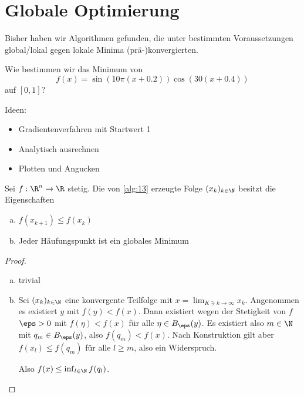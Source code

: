 \chapter{Globale Optimierung}



Bisher haben wir Algorithmen gefunden, die unter bestimmten Voraussetzungen global/lokal gegen lokale Minima (prä-)konvergierten.

Wie bestimmen wir das Minimum von
\[
	f(x) = \sin( 10 \pi (x + 0.2) ) \cos (30 (x + 0.4))
\]
auf $[0, 1]$?

Ideen:
\begin{itemize}
	\item
		Gradientenverfahren mit Startwert 1
	\item
		Analytisch ausrechnen
	\item
		Plotten und Angucken
\end{itemize}

\begin{alg} \label{alg:13}
	\begin{algorithmic}
			\Else
			\EndIf
		\EndFor
	\end{algorithmic}
\end{alg}

\begin{lem} \label{4.1}
	Sei $f: \R^n \to \R$ stetig.
	Die von \ref{alg:13} erzeugte Folge $(x_k)_{k\in\N}$ besitzt die Eigenschaften
	\begin{enumerate}[(a)]
		\item
			$f(x_{k+1}) \le f(x_k)$
		\item
			Jeder Häufungspunkt ist ein globales Minimum
	\end{enumerate}
	\begin{proof}
		\begin{enumerate}[(a)]
			\item
				trivial
			\item
				Sei $(x_k)_{k\in\N}$ eine konvergente Teilfolge mit $x = \lim_{K \ni k \to \infty} x_k$.
				Angenommen es existiert $y$ mit $f(y) < f(x)$.
				Dann existiert wegen der Stetigkeit von $f$ $\eps > 0$ mit $f(\eta) < f(x)$ für alle $\eta \in B_\eps(y)$.
				Es existiert also $m \in \N$ mit $q_m \in B_\eps(y)$, also $f(q_m) < f(x)$.
				Nach Konstruktion gilt aber $f(x_l) \le f(q_m)$ für alle $l \ge m$, also ein Widerspruch.

				Also $f(x) \le \inf_{l \in \N} f(q_l)$.
		\end{enumerate}
	\end{proof}
\end{lem}



